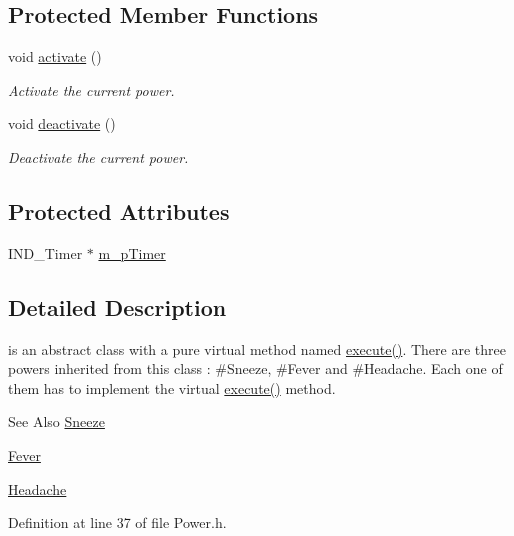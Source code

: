 \subsection*{Protected Member Functions}
\begin{DoxyCompactItemize}
\item 
void \hyperlink{class_symp_1_1_power_a754fa6ce4b830bd75e8a3402df4d4b15}{activate} ()
\begin{DoxyCompactList}\small\item\em Activate the current power. \end{DoxyCompactList}\item 
void \hyperlink{class_symp_1_1_power_a27f953cf5f790649fba090ed2ba1af3d}{deactivate} ()
\begin{DoxyCompactList}\small\item\em Deactivate the current power. \end{DoxyCompactList}\end{DoxyCompactItemize}
\subsection*{Protected Attributes}
\begin{DoxyCompactItemize}
\item 
I\-N\-D\-\_\-\-Timer $\ast$ \hyperlink{class_symp_1_1_power_a8f421a13e9e62dac404c6c1ef4862045}{m\-\_\-p\-Timer}
\end{DoxyCompactItemize}


\subsection{Detailed Description}
is an abstract class with a pure virtual method named \hyperlink{class_symp_1_1_power_a148a017c9f01bea343d062460074eae5}{execute()}. There are three powers inherited from this class \-: \#\-Sneeze, \#\-Fever and \#\-Headache. Each one of them has to implement the virtual \hyperlink{class_symp_1_1_power_a148a017c9f01bea343d062460074eae5}{execute()} method. \begin{DoxySeeAlso}{See Also}
\hyperlink{class_symp_1_1_sneeze}{Sneeze} 

\hyperlink{class_symp_1_1_fever}{Fever} 

\hyperlink{class_symp_1_1_headache}{Headache} 
\end{DoxySeeAlso}


Definition at line 37 of file Power.\-h.



